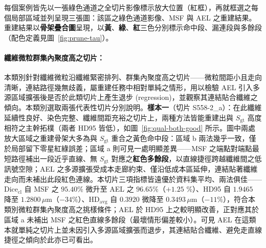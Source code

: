 每個案例皆先以一張綠色通道之全切片影像標示放大位置（紅框），再就框選之每個局部區域並列呈現三張圖：該區之綠色通道影像、MSF 與 AEL 之重建結果。重建結果以\textbf{骨架疊合圖}呈現，以\textbf{黃}、\textbf{綠}、\textbf{紅}三色分別標示命中段、漏連段與多餘段（配色定義見圖~\ref{fig:prune-tau}）。

\paragraph{纖維微粒群集內聚度高之切片：} 本類別針對纖維微粒沿纖維緊密排列、群集內聚度高之切片——微粒間距小且走向清晰，連結路徑幾無歧義，屬重建任務中相對單純之情形，用以檢驗 AEL 引入多源區域擴張後是否於此類切片上產生退步 (regression)，並觀察其連結貼合纖維之傾向。本類別選取兩張代表性切片分別說明。\textbf{樣本一}（切片 S558-2\_a）：在此纖維延續性良好、染色完整、纖維間距充裕之切片上，兩種方法皆能重建出與 $S_{\text{gt}}$ 高度相符之主幹拓樸（兩者 HD95 皆低），如圖~\ref{fig:qual-both-good} 所示。圖中兩處放大區域之重建骨架大多為與 $S_{\text{gt}}$ 重合之黃色命中段：區域 b 兩法幾乎一致，僅於局部留下零星紅綠誤差；區域 a 則可見一處明顯差異——MSF 之端點對端點最短路徑補出一段近乎直線、無 $S_{\text{gt}}$ 對應之\textbf{紅色多餘段}，以直線捷徑跨越纖維間之低訊號空隙；AEL 之多源擴張受成本走廊約束、僅沿低成本區延伸，連結貼著纖維走向而未補出此段紅色連線。本切片三項指標皆遠優於資料集平均、兩法俱佳——$\text{Dice}_{\text{cl}}$ 自 MSF 之 $95.40\%$ 微升至 AEL 之 $96.65\%$（$+1.25$ \%）、HD95 自 $1.9465$ 降至 $1.2800\,\mu\text{m}$（$-34\%$）、$\text{HD}_{\text{avg}}$ 自 $0.3920$ 微降至 $0.3493\,\mu\text{m}$（$-11\%$），符合本類別微粒群集內聚度高之挑樣條件；AEL 於 HD95 上之較明顯改善，正對應其於區域 a 未補出 MSF 之紅色直線多餘段（最壞情形偏差較小）。可見 AEL 在這類本就單純之切片上並未因引入多源區域擴張而退步，其連結貼合纖維、避免走直線捷徑之傾向於此亦已可看出。


